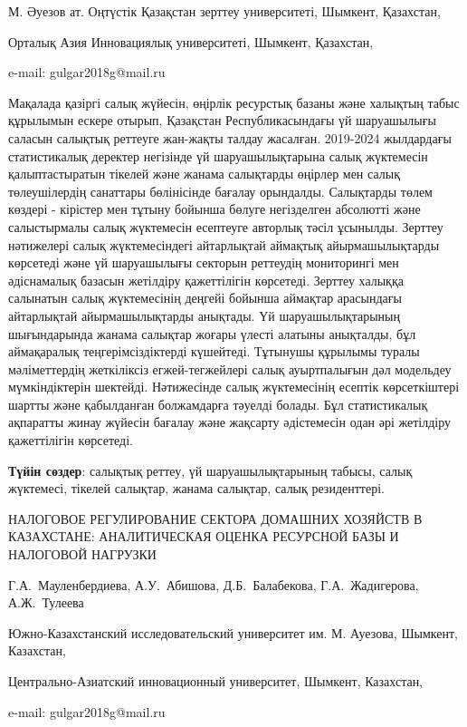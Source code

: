 \begin{affil}
М. Әуезов ат. Оңтүстік Қазақстан зерттеу университеті, Шымкент, Қазахстан,

Орталық Азия Инновациялық университеті, Шымкент, Қазахстан,

e-mail: gulgar2018g@mail.ru
\end{affil}

Мақалада қазіргі салық жүйесін, өңірлік ресурстық базаны және халықтың
табыс құрылымын ескере отырып, Қазақстан Республикасындағы үй
шаруашылығы саласын салықтық реттеуге жан-жақты талдау жасалған.
2019-2024 жылдардағы статистикалық деректер негізінде үй
шаруашылықтарына салық жүктемесін қалыптастыратын тікелей және жанама
салықтарды өңірлер мен салық төлеушілердің санаттары бөлінісінде бағалау
орындалды. Салықтарды төлем көздері - кірістер мен тұтыну бойынша бөлуге
негізделген абсолютті және салыстырмалы салық жүктемесін есептеуге
авторлық тәсіл ұсынылды. Зерттеу нәтижелері салық жүктемесіндегі
айтарлықтай аймақтық айырмашылықтарды көрсетеді және үй шаруашылығы
секторын реттеудің мониторингі мен әдіснамалық базасын жетілдіру
қажеттілігін көрсетеді. Зерттеу халыққа салынатын салық жүктемесінің
деңгейі бойынша аймақтар арасындағы айтарлықтай айырмашылықтарды
анықтады. Үй шаруашылықтарының шығындарында жанама салықтар жоғары
үлесті алатыны анықталды, бұл аймақаралық теңгерімсіздіктерді күшейтеді.
Тұтынушы құрылымы туралы мәліметтердің жеткіліксіз ег\-жей-тегжейлері
салық ауыртпалығын дәл модельдеу мүмкіндіктерін шектейді. Нәтижесінде
салық жүктемесінің есептік көрсеткіштері шартты және қабылданған
болжамдарға тәуелді болады. Бұл статистикалық ақпаратты жинау жүйесін
бағалау және жақсарту әдістемесін одан әрі жетілдіру қажеттілігін
көрсетеді.

{\bfseries Түйін сөздер}: салықтық реттеу, үй шаруашылықтарының табысы,
салық жүктемесі, тікелей салықтар, жанама салықтар, салық резиденттері.

\begin{header}
НАЛОГОВОЕ РЕГУЛИРОВАНИЕ СЕКТОРА ДОМАШНИХ ХОЗЯЙСТВ В КАЗАХСТАНЕ: АНАЛИТИЧЕСКАЯ ОЦЕНКА РЕСУРСНОЙ БАЗЫ И НАЛОГОВОЙ НАГРУЗКИ

Г.А.~Мауленбердиева\envelope,
А.У.~Абишова,
Д.Б.~Балабекова,
Г.А.~Жадигерова,
А.Ж.~Тулеева
\end{header}

\begin{affil}
Южно-Казахстанский исследовательский университет им. М. Ауезова, Шымкент, Казахстан,

Центрально-Азиатский инновационный университет, Шымкент, Казахстан,

e-mail: gulgar2018g@mail.ru
\end{affil}

